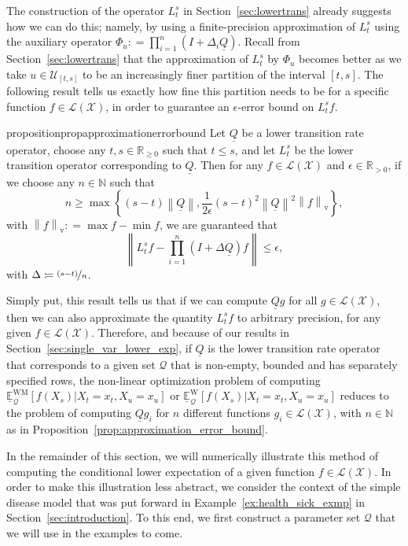 \documentclass[10pt,a4paper]{paper}
\theoremstyle{definition}
\newcommand{\nats}{\mathbb{N}}
\newcommand{\reals}{\mathbb{R}}
\newcommand{\realspos}{\reals_{>0}}
\newcommand{\realsnonneg}{\reals_{\geq 0}}
\newcommand{\states}{\mathcal{X}}
\newcommand{\gambles}{\mathcal{L}}
\newcommand{\gamblesX}{\gambles(\states)}
\newcommand{\rateset}{\mathcal{Q}}
\newcommand{\lrate}{\underline{Q}}
\newcommand{\norm}[1]{\left\lVert #1 \right\rVert}
\newcommand{\coloneqq}{:\!=}
\begin{document}
The construction of the operator $L_t^s$ in Section~\ref{sec:lowertrans} already suggests how we can do this; namely, by using a finite-precision approximation of $L_t^s$ using the auxiliary operator $\Phi_u\coloneqq \prod_{i=1}^n(I+\Delta_i\lrate)$. Recall from Section~\ref{sec:lowertrans} that the approximation of $L_t^s$ by $\Phi_u$ becomes better as we take $u\in\mathcal{U}_{[t,s]}$ to be an increasingly finer partition of the interval $[t,s]$. The following result tells us exactly how fine this partition needs to be for a specific function $f\in\gamblesX$, in order to guarantee an $\epsilon$-error bound on $L_t^sf$.

\begin{restatable}{proposition}{propapproximationerrorbound}
\label{prop:approximation_error_bound}
Let $\lrate$ be a lower transition rate operator, choose any $t,s\in\realsnonneg$ such that $t\leq s$, and let $L_t^s$ be the lower transition operator corresponding to $\lrate$. Then for any $f\in\gamblesX$ and $\epsilon\in\realspos$, if we choose any $n\in\nats$ such that
\begin{equation*}
n \geq\max\left\{
(s-t)\norm{\lrate},
\frac{1}{2\epsilon}(s-t)^2\norm{\lrate}^2\norm{f}_\mathrm{v}
\right\},
\end{equation*}
with $\norm{f}_\mathrm{v}\coloneqq\max f-\min f$,
we are guaranteed that
\begin{equation*}
\norm{L_t^sf - \prod_{i=1}^n(I + \Delta\lrate)f} \leq \epsilon,
\end{equation*}
with $\Delta\coloneqq \nicefrac{(s-t)}{n}$.
\end{restatable}

Simply put, this result tells us that if we can compute $\lrate g$ for all $g\in\gamblesX$, then we can also approximate the quantity $L_t^sf$ to arbitrary precision, for any given $f\in\gamblesX$. Therefore, and because of our results in Section~\ref{sec:single_var_lower_exp}, if $\lrate$ is the lower transition rate operator that corresponds to a given set $\rateset$ that is non-empty, bounded and has separately specified rows, the non-linear optimization problem of computing $\underline{\mathbb{E}}_\rateset^\mathrm{WM}[f(X_s)\vert X_t=x_t,X_u=x_u]$ or $\underline{\mathbb{E}}_\rateset^\mathrm{W}[f(X_s)\vert X_t=x_t,X_u=x_u]$ reduces to the problem of computing $\lrate g_i$ for $n$ different functions $g_i\in\gamblesX$, with $n\in\nats$ as in Proposition~\ref{prop:approximation_error_bound}.

In the remainder of this section, we will numerically illustrate this method of computing the conditional lower expectation of a given function $f\in\gamblesX$. In order to make this illustration less abstract, we consider the context of the simple disease model that was put forward in Example~\ref{ex:health_sick_exmp} in Section~\ref{sec:introduction}. To this end, we first construct a parameter set $\rateset$ that we will use in the examples to come.
\end{document}

